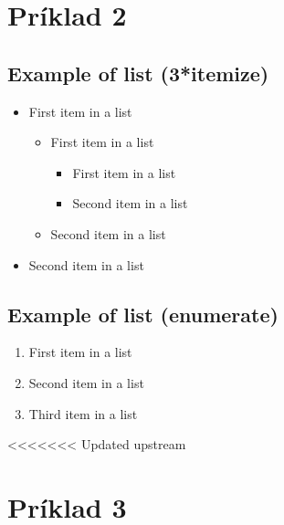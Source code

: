 \documentclass[paper=a4, fontsize=11pt]{scrartcl} %
\numberwithin{equation}{section} %
\numberwithin{figure}{section} %
\numberwithin{table}{section} %
\begin{document}
\section*{Príklad 2}

\subsection{Example of list (3*itemize)}
\begin{itemize}
	\item First item in a list 
		\begin{itemize}
		\item First item in a list 
			\begin{itemize}
			\item First item in a list 
			\item Second item in a list 
			\end{itemize}
		\item Second item in a list 
		\end{itemize}
	\item Second item in a list 
\end{itemize}


\subsection{Example of list (enumerate)}
\begin{enumerate}
\item First item in a list 
\item Second item in a list 
\item Third item in a list
\end{enumerate}


<<<<<<< Updated upstream
\pagebreak

\section*{Príklad 3}

\pagebreak
\end{document}
